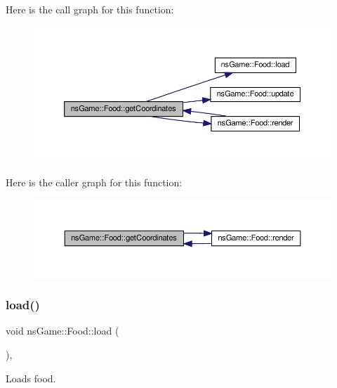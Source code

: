 Here is the call graph for this function\+:
\nopagebreak
\begin{figure}[H]
\begin{center}
\leavevmode
\includegraphics[width=350pt]{classns_game_1_1_food_a65337270b0da5319663117449547118c_cgraph}
\end{center}
\end{figure}
Here is the caller graph for this function\+:
\nopagebreak
\begin{figure}[H]
\begin{center}
\leavevmode
\includegraphics[width=350pt]{classns_game_1_1_food_a65337270b0da5319663117449547118c_icgraph}
\end{center}
\end{figure}
\mbox{\label{classns_game_1_1_food_a3d166bdb20aea5fe4ebf3c90b9c27e85}} 
\subsubsection{\texorpdfstring{load()}{load()}}
{\footnotesize\ttfamily void ns\+Game\+::\+Food\+::load (\begin{DoxyParamCaption}{ }\end{DoxyParamCaption})\hspace{0.3cm}{\ttfamily [override]}, {\ttfamily [virtual]}}



Loads food. 



